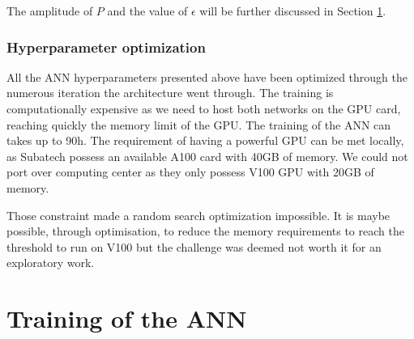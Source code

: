 \documentclass[../main.tex]{subfiles}
\begin{document}
The amplitude of $P$ and the value of $\epsilon$ will be further discussed in Section \ref{sec:janne:arch:training}.

\subsubsection{Hyperparameter optimization}

All the ANN hyperparameters presented above have been optimized through the numerous iteration the architecture went through. The training is computationally expensive as we need to host both networks on the GPU card, reaching quickly the memory limit of the GPU. The training of the ANN can takes up to 90h. The requirement of having a powerful GPU can be met locally, as Subatech possess an available A100 \cite{noauthor_nvidia_nodate-1} card with 40GB of memory. We could not port over computing center as they only possess V100 \cite{noauthor_nvidia_nodate-2} GPU with 20GB of memory.

Those constraint made a random search optimization impossible. It is maybe possible, through optimisation, to reduce the memory requirements to reach the threshold to run on V100 but the challenge was deemed not worth it for an exploratory work.

\section{Training of the ANN}
\label{sec:janne:arch:training}
\end{document}
